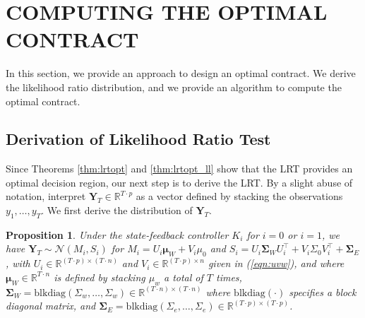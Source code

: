 \documentclass[letterpaper, 10 pt, conference]{ieeeconf}  %
\newtheorem{proposition}{Proposition}
\begin{document}
\section{COMPUTING THE OPTIMAL CONTRACT}
\label{sec:ctoc}
In this section, we provide an approach to design an optimal contract. We derive the likelihood ratio distribution, and  we provide an algorithm to compute the optimal contract. 


\subsection{Derivation of Likelihood Ratio Test}
Since Theorems \ref{thm:lrtopt} and \ref{thm:lrtopt_ll} show that the LRT provides an optimal decision region, our next step is to derive the LRT. By a slight abuse of notation, interpret $\mathbf{Y}_T \in \mathbb{R}^{T\cdot p}$ as a vector defined by stacking the observations $y_1,\ldots,y_T$. We first derive the distribution of $\mathbf{Y}_T$.

\begin{proposition}
\label{prop:ytdist}
    Under the state-feedback controller $K_i$ for $i = 0$ or $i = 1$, we have $\mathbf{Y}_T \sim \mathcal{N}(M_i, S_i)$ for $M_i = U_i\boldsymbol{\mu}_W + V_i\mu_0$ and $S_i = U_i\mathbf{\Sigma}_WU_i^\top + V_i\Sigma_0V_i^\top + \mathbf{\Sigma}_E$, with $U_i\in\mathbb{R}^{(T\cdot p)\times(T\cdot n)}$ and $V_i \in \mathbb{R}^{(T\cdot p)\times n}$ given in (\ref{eqn:uvw}), and where $\boldsymbol{\mu}_W \in \mathbb{R}^{T\cdot n}$ is defined by stacking $\mu_w$ a total of $T$ times, $\mathbf{\Sigma}_W = \textrm{blkdiag}(\Sigma_w, \ldots, \Sigma_w) \in \mathbb{R}^{(T\cdot n)\times(T\cdot n)}$ where $\textrm{blkdiag}(\cdot)$ specifies a block diagonal matrix, and $\mathbf{\Sigma}_E = \textrm{blkdiag}(\Sigma_e, \ldots,\Sigma_e) \in \mathbb{R}^{(T\cdot p)\times(T\cdot p)}$.
\end{proposition}
\end{document}
